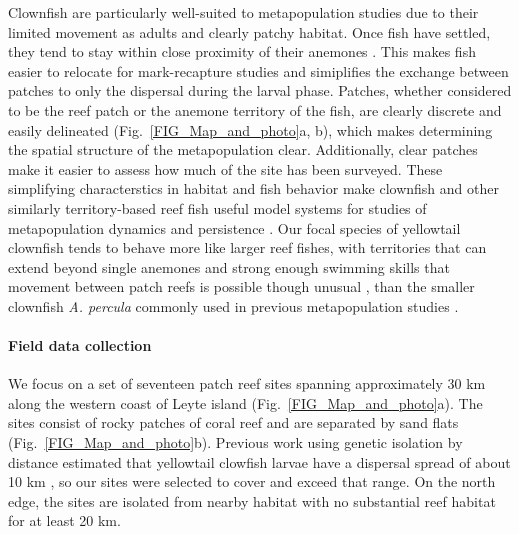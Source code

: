 \documentclass[12pt, oneside]{article}   	%
\begin{document}

Clownfish are particularly well-suited to metapopulation studies due to their limited movement as adults and clearly patchy habitat. Once fish have settled, they tend to stay within close proximity of their anemones \citep[XX meters,][]{stuartInPrephomerange}. This makes fish easier to relocate for mark-recapture studies and simiplifies the exchange between patches to only the dispersal during the larval phase. Patches, whether considered to be the reef patch or the anemone territory of the fish, are clearly discrete and easily delineated (Fig.\ \ref{FIG_Map_and_photo}a, b), which makes determining the spatial structure of the metapopulation clear. Additionally, clear patches make it easier to assess how much of the site has been surveyed. These simplifying characterstics in habitat and fish behavior make clownfish and other similarly territory-based reef fish useful model systems for studies of metapopulation dynamics and persistence \citep[e.g.][]{buston2013marine, salles_coral_2015, johnson2018integrating}. Our focal species of yellowtail clownfish tends to behave more like larger reef fishes, with territories that can extend beyond single anemones \citep{hattori1991life, ochi1989mating} and strong enough swimming skills that movement between patch reefs is possible though unusual \citep[seen XX times at our sites,][]{stuartInPrephomerange}, than the smaller clownfish \textit{A. percula} commonly used in previous metapopulation studies \citep[e.g.][]{buston2011probability, salles_coral_2015}.

\paragraph*{Field data collection}

We focus on a set of seventeen patch reef sites spanning approximately 30 km along the western coast of Leyte island (Fig.\ \ref{FIG_Map_and_photo}a). The sites consist of rocky patches of coral reef and are separated by sand flats (Fig.\ \ref{FIG_Map_and_photo}b). Previous work using genetic isolation by distance estimated that yellowtail clowfish larvae have a dispersal spread of about 10 km \citep[range 4-27 km,][]{pinsky2010using}, so our sites were selected to cover and exceed that range. On the north edge, the sites are isolated from nearby habitat with no substantial reef habitat for at least 20 km. %
\end{document}
